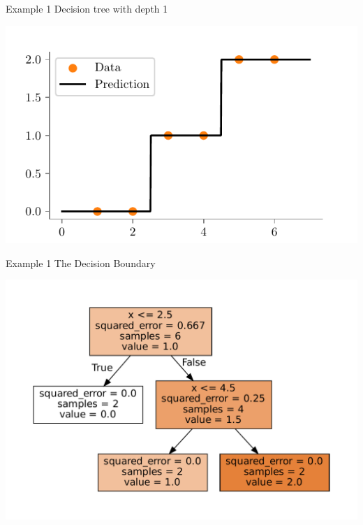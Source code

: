 \documentclass{beamer}
\begin{document}
\begin{frame}{Example 1}
	Decision tree with depth 1
	\begin{center}
	\includegraphics{../figures/decision-trees/ri-ro-depth-2.pdf}	
	\end{center}
	\end{frame}
	
	\begin{frame}{Example 1}
	The Decision Boundary
	\begin{center}
	\includegraphics[scale=0.6]{../figures/decision-trees/ri-ro-depth-2-sklearn.pdf}
	\end{center}
	\end{frame}
	
\end{document}
